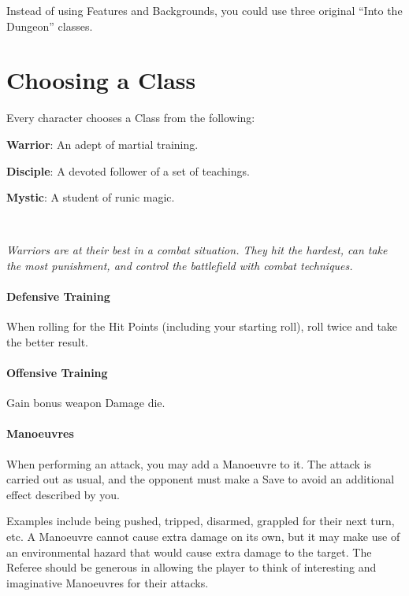 \documentclass[itdr]{subfiles}
\begin{document}
	
\cleartoleftpage


Instead of using Features and Backgrounds, you could use three original ``Into the Dungeon'' classes.

\section{Choosing a Class}

Every character chooses a Class from the following:

\textbf{Warrior}: An adept of martial training.

\textbf{Disciple}: A devoted follower of a set of teachings.

\textbf{Mystic}: A student of runic magic.

~

{\em Warriors are at their best in a combat situation. They hit the hardest, can take the most punishment, and control the battlefield with combat techniques.}

\paragraph{Defensive Training}
When rolling for the Hit Points (including your starting roll), roll twice and take the better result.

\paragraph{Offensive Training}
Gain bonus weapon Damage die.

\paragraph{Manoeuvres}
When performing an attack, you may add a Manoeuvre to it. The attack is carried out as usual, and the opponent must make a Save to avoid an additional effect described by you.

Examples include being pushed, tripped, disarmed, grappled for their next turn, etc. A Manoeuvre cannot cause extra damage on its own, but it may make use of an environmental hazard that would cause extra damage to the target. The Referee should be generous in allowing the player to think of interesting and imaginative Manoeuvres for their attacks.

\vfill
\break
\end{document}
